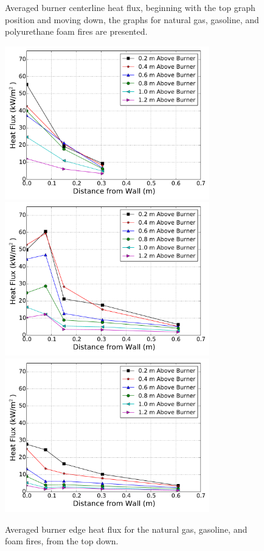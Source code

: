 \documentclass[twoside]{uocthesis}
\begin{document}
\begin{figure}[p]
	\caption[Averaged burner centerline heat flux for the natural gas, gasoline, and foam fires]{Averaged burner centerline heat flux, beginning with the top graph position and moving down, the graphs for natural gas, gasoline, and polyurethane foam fires are presented.}
	\label{IWGB_HF_Comp_Center}
\end{figure}

\begin{figure}[p]
	\centering
	\includegraphics[width=3.5in]{../Figures/IWGB_NG_HF_Offset_Avg}\\
	\includegraphics[width=3.5in]{../Figures/IWGB_GAS_HF_Offset_Avg}\\
	\includegraphics[width=3.5in]{../Figures/IWGB_PUF_HF_Offset_Avg}\\
	\caption[Averaged burner edge heat flux for the natural gas, gasoline, and foam fires]{Averaged burner edge heat flux for the natural gas, gasoline, and foam fires, from the top down.}
	\label{IWGB_HF_Comp_Edge}
\end{figure}
\end{document}
